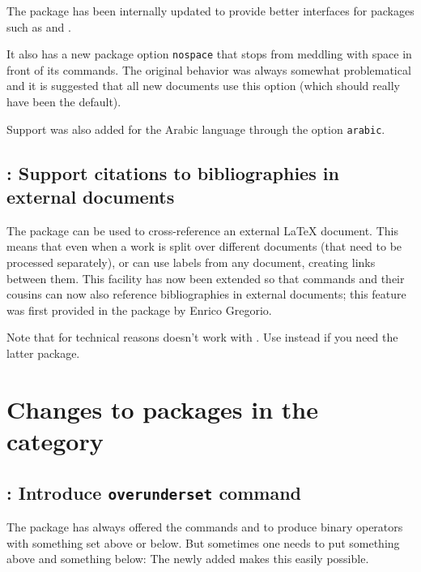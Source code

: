 \documentclass{ltnews}
\providecommand\option[1]{\texttt{#1}}
\begin{document}
The  package has been internally updated to provide
better interfaces for packages such as  and
.

It also  
has a new package option \option{nospace} that stops
 from meddling with space in front of
its commands. The
original behavior was always somewhat problematical and it is
suggested that 
all new documents 
use this option (which
should really have been the default).

Support was also added for the Arabic language through the option
\option{arabic}.



        
\subsection[\pkg{xr}: Support citations to bibliographies in\\ external documents]
{: Support citations to bibliographies in external documents}

The  package can be used to cross-reference an external \LaTeX{} 
document. 
This means that even when a work is split over different documents (that
need to be processed separately),  or  can use labels from 
any document, creating links between them. This facility has now been extended 
so that  commands and
their cousins can now also reference bibliographies in external
documents; this feature was first provided in the package
 by Enrico Gregorio.

Note that for technical reasons  doesn't work with
. Use  instead if you need the latter
package.


\section{Changes to packages in the  category}

\subsection{: Introduce \texttt{overunderset} command}

The  package has always offered 
the commands  and
 to produce binary operators with something set above or
below. But sometimes one needs to put something above and something below: 
The newly added  makes this
easily possible.
\end{document}
